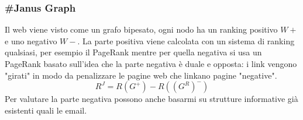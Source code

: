 \subsubsection{\#Janus Graph}
Il web viene visto come un grafo bipesato, ogni nodo ha un ranking positivo $W+$ e uno negativo $W-$.
La parte positiva viene calcolata con un sistema di ranking qualsiasi, per esempio il PageRank mentre per quella negativa si usa un PageRank basato sull'idea che la parte negativa è duale e opposta: i link vengono "girati" in modo da penalizzare le pagine web che linkano pagine "negative".
$$ R^J = R(G^+) - R((G^R)^-) $$
Per valutare la parte negativa possono anche basarmi su strutture informative già esistenti quali le email.


